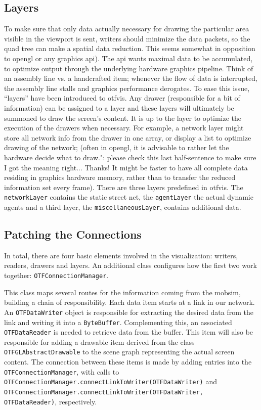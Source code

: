 \subsection{Layers}
To make sure that only data actually necessary for drawing the particular area visible in the viewport is sent, writers should minimize the data packets, so the quad tree can make a spatial data reduction. This seems somewhat in opposition to \gls{opengl} or any graphics \gls{api}). The \gls{api} wants maximal data to be accumulated, to optimize output through the underlying hardware graphics pipeline. 
Think of an assembly line vs. a handcrafted item; whenever the flow of data is interrupted, the assembly line stalls and graphics performance derogates. 
To ease this issue, ``layers'' have been introduced to \gls{otfvis}. 
Any drawer (responsible for a bit of information) can be assigned to a layer and 
these layers will ultimately be summoned to draw the screen's content. 
It is up to the layer to optimize the execution of the drawers when necessary. 
For example, a network layer might store all network info from the drawer in one array, or display a list to optimize drawing of the network; (often in \gls{opengl}, it is advisable to rather let the hardware decide what to draw."\Karen:  {please check this last half-sentence to make sure I got the meaning right... Thanks!} 
It might be faster to have all complete data residing in graphics hardware memory, rather than to transfer the reduced information set every frame). There are three layers predefined in \gls{otfvis}. 
The \lstinline|networkLayer| contains the static street net, the \lstinline|agentLayer| the actual dynamic agents and a third layer, the \lstinline|miscellaneousLayer|,  contains additional data.

\subsection{Patching the Connections}
In total, there are four basic elements involved in the visualization: writers, readers, drawers and layers. 
An additional class configures how the first two work together: \lstinline|OTFConnectionManager|.

This class maps several routes for the information coming from the \gls{mobsim}, building a chain of responsibility. 
Each data item starts at a link in our network. 
An \lstinline|OTFDataWriter| object is responsible for extracting the desired data from the link and writing it into a \lstinline|ByteBuffer|. 
Complementing this, an associated \lstinline|OTFDataReader| is needed to retrieve data from the buffer. 
This item will also be responsible for adding a drawable item derived from the class \lstinline|OTFGLAbstractDrawable| to the scene graph representing the actual screen content. 
The connection between these items is made by adding entries into the \lstinline|OTFConnectionManager|, with calls to \lstinline|OTFConnectionManager.connectLinkToWriter(OTFDataWriter)| 
and \lstinline|OTFConnectionManager.connectLinkToWriter(OTFDataWriter, OTFDataReader)|, respectively.
 
